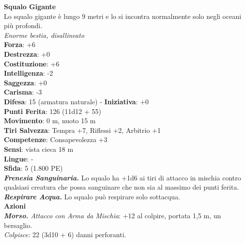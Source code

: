 \begin{multicols}{2}
\medskip\textbf{Squalo Gigante}\\
Lo squalo gigante è lungo 9 metri e lo si incontra normalmente solo negli oceani più profondi.\\
\emph{Enorme bestia, disallineato}\\
\textbf{Forza}: +6\\
\textbf{Destrezza}: +0\\
\textbf{Costituzione}: +6\\
\textbf{Intelligenza}: -2\\
\textbf{Saggezza}: +0\\
\textbf{Carisma}: -3\\
\textbf{Difesa}: 15 (armatura naturale) - \textbf{Iniziativa}: +0\\
\textbf{Punti Ferita}: 126 (11d12 + 55)\\
\textbf{Movimento}: 0 m, nuoto 15 m\\
\textbf{Tiri Salvezza}: Tempra +7, Riflessi +2, Arbitrio +1\\
\textbf{Competenze}: Consapevolezza +3\\
\textbf{Sensi}: vista cieca 18 m\\
\textbf{Lingue}: -\\
\textbf{Sfida}: 5 (1.800 PE)\smallskip\\
\emph{\textbf{Frenesia Sanguinaria.}} Lo squalo ha +1d6 ai tiri di attacco in mischia contro qualsiasi creatura che possa sanguinare che non sia al massimo dei punti ferita.\\
\emph{\textbf{Respirare Acqua.}} Lo squalo può respirare solo sottacqua.\\
\smallskip\textbf{Azioni}\\
\emph{\textbf{Morso.} Attacco con Arma da Mischia}: +12 al colpire, portata 1,5 m, un bersaglio.\\
\emph{Colpisce:} 22 (3d10 + 6) danni perforanti.\\



\end{multicols}

